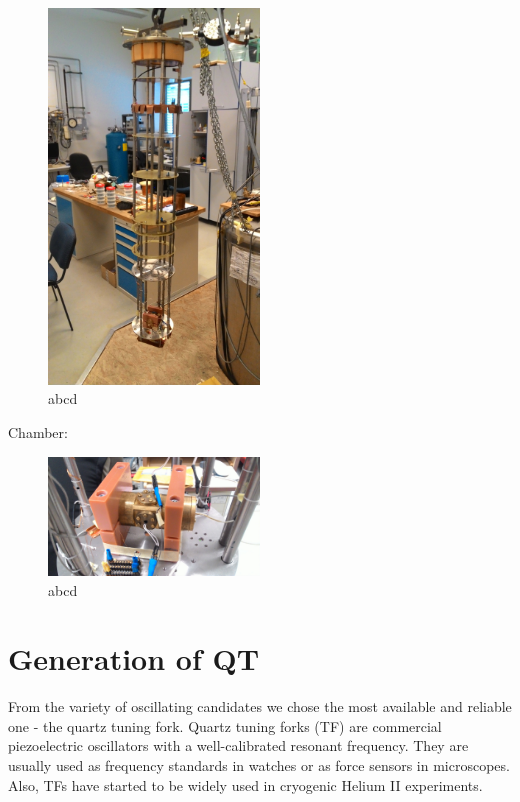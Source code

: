 \begin{figure}[h]
	\centering
	\includegraphics[width=0.5\textwidth]{graphics/exp/insert}
	\caption{abcd}
\end{figure}

Chamber:

\begin{figure}[h]
	\centering
	\includegraphics[width=0.5\textwidth]{graphics/exp/chamber}
	\caption{abcd}
\end{figure}

\section{Generation of QT}

From the variety of oscillating candidates we chose the most available and reliable one - the quartz tuning fork. Quartz tuning forks (TF) are commercial piezoelectric oscillators with a well-calibrated resonant frequency. They are usually used as frequency standards in watches or as force sensors in microscopes. Also, TFs have started to be widely used in cryogenic Helium II experiments.

